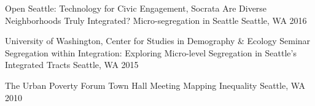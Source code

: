 \begin{cventries}
  \cventry
    {Open Seattle: Technology for Civic Engagement, Socrata} %
    {Are Diverse Neighborhoods Truly Integrated? Micro-segregation in Seattle} %
    {Seattle, WA} %
    {2016} %
    {}
    
  \cventry
    {University of Washington, Center for Studies in Demography \& Ecology Seminar} %
    {Segregation within Integration: Exploring Micro-level Segregation in Seattle's Integrated Tracts} %
    {Seattle, WA} %
    {2015} %
    {}
    
    
    
    
    
  \cventry
    {The Urban Poverty Forum Town Hall Meeting} %
    {Mapping Inequality} %
    {Seattle, WA} %
    {2010} %
    {}


\end{cventries}



